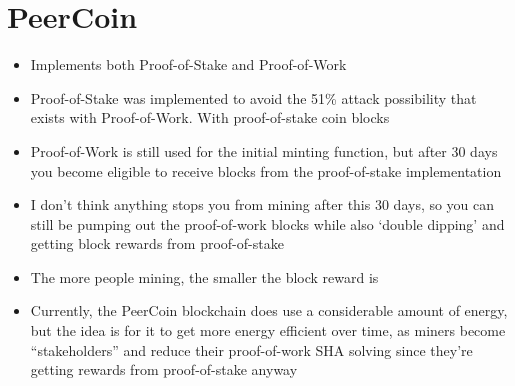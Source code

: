 \section{PeerCoin}
\begin{itemize}
	\item Implements both Proof-of-Stake and Proof-of-Work
	\item Proof-of-Stake was implemented to avoid the 51\% attack possibility that exists with Proof-of-Work. With proof-of-stake coin blocks
	\item Proof-of-Work is still used for the initial minting function, but after 30 days you become eligible to receive blocks from the proof-of-stake implementation
	\item I don't think anything stops you from mining after this 30 days, so you can still be pumping out the proof-of-work blocks while also `double dipping' and getting block rewards from proof-of-stake
	\item The more people mining, the smaller the block reward is
	\item Currently, the PeerCoin blockchain does use a considerable amount of energy, but the idea is for it to get more energy efficient over time, as miners become ``stakeholders'' and reduce their proof-of-work SHA solving since they're getting rewards from proof-of-stake anyway
\end{itemize}